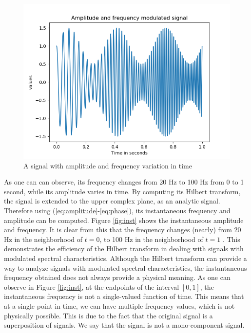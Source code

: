 \documentclass[../Main/thesis.tex]{subfiles}
\begin{document}
\begin{figure}[H]
	\centering
	\includegraphics[width=1\linewidth]{../fig/mode}
	\caption{A signal with amplitude and frequency variation in time}
	\label{fig:mode}
\end{figure}
\justify
As one can can observe, its frequency changes from 20 Hz to 100 Hz from 0 to 1 second, while its amplitude varies in time. By computing its Hilbert transform, the signal is extended to the upper complex plane, as an analytic signal. Therefore using (\ref{eq:amplitude}-\ref{eq:phase}), its instantaneous frequency and amplitude can be computed.
\justify
Figure \ref{fig:inst} shows the instantaneous amplitude and frequency. It is clear from this that the frequency changes (nearly) from 20 Hz in the neighborhood of $t=0$, to 100 Hz in the neighborhood of $t = 1$ . This demonstrates the efficiency of the Hilbert transform in dealing with signals with modulated spectral characteristics. 
\justify
Although the Hilbert transform can provide a way to analyze signals with modulated spectral characteristics, the instantaneous frequency obtained does not always provide a physical meaning. As one can observe in Figure \ref{fig:inst}, at the endpoints of the interval $[0,1]$, the instantaneous frequency is not a single-valued function of time. This means that at a single point in time, we can have multiple frequency values, which is not physically possible. This is due to the fact that the original signal is a superposition of signals. We say that the signal is not a mono-component signal.
\end{document}
